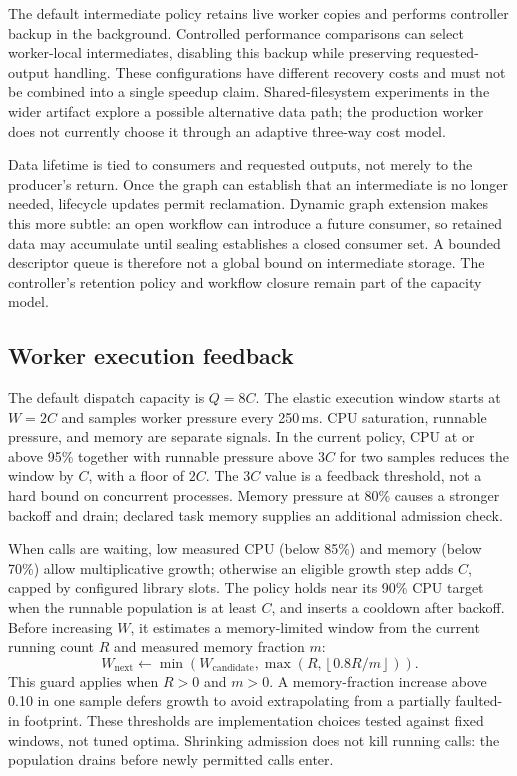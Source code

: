 The default intermediate policy retains live worker copies and performs
controller backup in the background. Controlled performance comparisons can
select worker-local intermediates, disabling this backup while preserving
requested-output handling. These configurations have different recovery
costs and must not be combined into a single speedup claim. Shared-filesystem
experiments in the wider artifact explore a possible alternative data path;
the production worker does not currently choose it through an adaptive
three-way cost model.

Data lifetime is tied to consumers and requested outputs, not merely to the
producer's return. Once the graph can establish that an intermediate is no
longer needed, lifecycle updates permit reclamation. Dynamic graph extension
makes this more subtle: an open workflow can introduce a future consumer, so
retained data may accumulate until sealing establishes a closed consumer set.
A bounded descriptor queue is therefore not a global bound on intermediate
storage. The controller's retention policy and workflow closure remain part
of the capacity model.

\subsection{Worker execution feedback}
The default dispatch capacity is $Q=8C$. The elastic execution window starts
at $W=2C$ and samples worker pressure every 250\,ms. CPU saturation, runnable
pressure, and memory are separate signals. In the current policy, CPU at or
above 95\% together with runnable pressure above $3C$ for two samples reduces
the window by $C$, with a floor of $2C$. The $3C$ value is a feedback threshold,
not a hard bound on concurrent processes. Memory pressure at 80\% causes a
stronger backoff and drain; declared task memory supplies an additional
admission check.

When calls are waiting, low measured CPU (below 85\%) and memory (below
70\%) allow multiplicative growth; otherwise an eligible growth step adds
$C$, capped by configured library slots. The policy holds near its 90\% CPU
target when the runnable population is at least $C$, and inserts a cooldown
after backoff. Before increasing $W$, it estimates a memory-limited window
from the current running count $R$ and measured memory fraction $m$:
\begin{equation}
W_{\mathrm{next}}\leftarrow\min\left(W_{\mathrm{candidate}},
\max\left(R,\left\lfloor0.8R/m\right\rfloor\right)\right).
\end{equation}
This guard applies when $R>0$ and $m>0$. A memory-fraction increase above
0.10 in one sample defers growth to avoid extrapolating from a partially
faulted-in footprint. These thresholds are implementation choices tested
against fixed windows, not tuned optima. Shrinking admission does not kill
running calls: the population drains before newly permitted calls enter.

